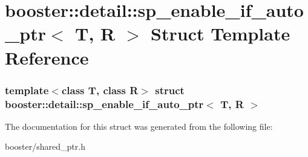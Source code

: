 \section{booster\-:\-:detail\-:\-:sp\-\_\-enable\-\_\-if\-\_\-auto\-\_\-ptr$<$ \-T, \-R $>$ \-Struct \-Template \-Reference}
\label{structbooster_1_1detail_1_1sp__enable__if__auto__ptr}
\subsubsection*{template$<$class T, class R$>$ struct booster\-::detail\-::sp\-\_\-enable\-\_\-if\-\_\-auto\-\_\-ptr$<$ T, R $>$}



\-The documentation for this struct was generated from the following file\-:\begin{DoxyCompactItemize}
\item 
booster/shared\-\_\-ptr.\-h\end{DoxyCompactItemize}
